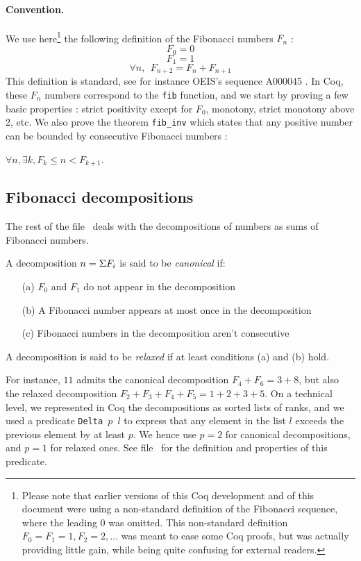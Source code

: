 \documentclass[a4paper,11pt]{article}
\begin{document}
\paragraph{Convention.} We use here\footnote{
Please note that earlier versions of this Coq development
and of this document were using a non-standard definition
of the Fibonacci sequence, where the leading 0 was omitted.
This non-standard definition $F_0=F_1=1, F_2=2, ...$ was meant
to ease some Coq proofs, but was actually providing little gain,
while being quite confusing for external readers.}
the following definition of the Fibonacci numbers $F_n$ :
$$F_0 = 0 $$
$$F_1 = 1 $$
$$\forall n,~~ F_{n+2} = F_{n}+F_{n+1}$$
This definition is standard, see for instance OEIS's sequence A000045
\cite{OEIS-Fib}.
In Coq, these $F_n$ numbers correspond to the {\tt fib}
function, and we start by proving a few basic properties :
strict positivity except for $F_0$, monotony, strict monotony
above 2, etc. 
We also prove the theorem {\tt fib\_inv} which states 
that any positive number can be bounded by
consecutive Fibonacci numbers :

\begin{theorem}\label{fibinv}
$\forall n, \exists k, F_k \le n < F_{k+1}$.
\end{theorem}

\subsection{Fibonacci decompositions} The rest of the file \
deals with the decompositions of numbers as sums of Fibonacci
numbers.
\begin{definition}
 A decomposition $n = \Sigma F_i$ is said to be \emph{canonical} if:
\begin{itemize}
\item[(a)] $F_0$ and $F_1$ do not appear in the decomposition
\item[(b)] A Fibonacci number appears at most once in the decomposition
\item[(c)] Fibonacci numbers in the decomposition aren't consecutive
\end{itemize}
A decomposition is said to be \emph{relaxed} if at least conditions
(a) and (b) hold. 
\end{definition}
For instance, $11$ admits the canonical decomposition
$F_4+F_6 = 3 + 8$, but also the relaxed decomposition $F_2+F_3+F_4+F_5
= 1 + 2 + 3 + 5$.
On a technical level, we represented in Coq the decompositions
as sorted lists of ranks, and we used a predicate {\tt Delta $p$ $l$}
to express that any element in the list $l$ exceeds the previous
element by at least $p$. We hence use $p=2$ for canonical
decompositions, and $p=1$ for relaxed ones. See file
\ for the definition and properties of this
predicate.
\end{document}
